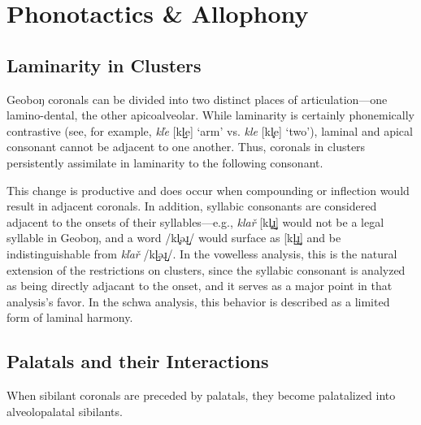 \documentclass[a4paper,11pt,oneside,openany]{memoir}
\newcommand{\bripa}[1]{[#1]}
\newcommand{\phipa}[1]{/#1/}
\newcommand{\vr}{ř}
\newcommand{\vl}{ľ}
\newcommand{\alvr}{ɹ}
\newcommand{\engma}{ŋ}
\newcommand{\schwa}{ə}
\newcommand{\sylb}{̩}
\newcommand{\lamino}{̻}
\newcommand{\apico}{̺}
\begin{document}
\section{Phonotactics \& Allophony}\label{sec:allophony}

\subsection{Laminarity in Clusters}

Geobo\engma{} coronals can be divided into two distinct places of articulation---one lamino-dental, the other apicoalveolar. While laminarity is certainly phonemically contrastive (see, for example, \textit{k\vl e} \bripa{kl\apico e} `arm' vs. \textit{kle} \bripa{kl\lamino e} `two'), laminal and apical consonant cannot be adjacent to one another. Thus, coronals in clusters persistently assimilate in laminarity to the following consonant. 

This change is productive and does occur when compounding or inflection would result in adjacent coronals. In addition, syllabic consonants are considered adjacent to the onsets of their syllables---e.g., \textit{kla\vr} \bripa{kl\lamino\alvr\apico\sylb} would not be a legal syllable in Geobo\engma{}, and a word \phipa{kl\lamino\schwa\alvr\apico} would surface as \bripa{kl\apico\alvr\apico\sylb} and be indistinguishable from \textit{k\vl a\vr} \phipa{kl\apico\schwa\alvr\apico}. In the vowelless analysis, this is the natural extension of the restrictions on clusters, since the syllabic consonant is analyzed as being directly adjacant to the onset, and it serves as a major point in that analysis's favor. In the schwa analysis, this behavior is described as a limited form of laminal harmony. 

\setlength{\tabcolsep}{1pt}
\begin{center}
\end{center}

\subsection{Palatals and their Interactions}

When sibilant coronals are preceded by palatals, they become palatalized into alveolopalatal sibilants. 

\begin{center}
\end{center}
\end{document}
